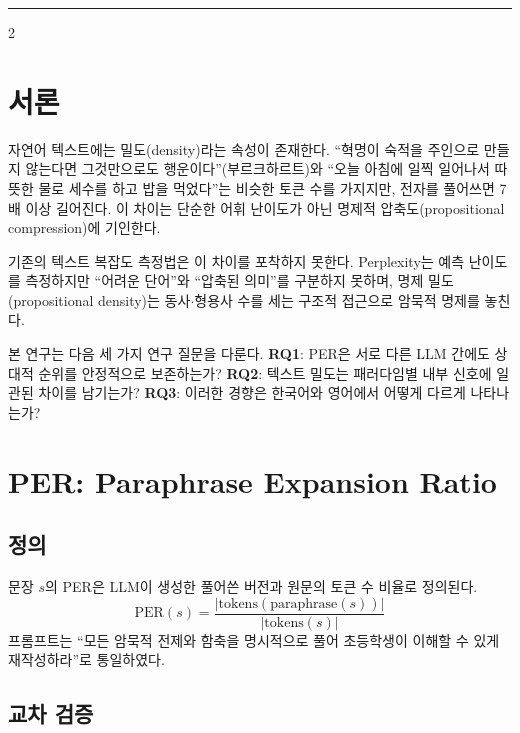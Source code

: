 \documentclass[10pt,a4paper]{article}
\begin{document}
\vspace{10pt}
\noindent\rule{\textwidth}{0.4pt}
\vspace{6pt}

\begin{multicols}{2}

\section{서론}

자연어 텍스트에는 밀도(density)라는 속성이 존재한다. ``혁명이 숙적을 주인으로 만들지 않는다면 그것만으로도 행운이다''(부르크하르트)와 ``오늘 아침에 일찍 일어나서 따뜻한 물로 세수를 하고 밥을 먹었다''는 비슷한 토큰 수를 가지지만, 전자를 풀어쓰면 7배 이상 길어진다. 이 차이는 단순한 어휘 난이도가 아닌 명제적 압축도(propositional compression)에 기인한다.

기존의 텍스트 복잡도 측정법은 이 차이를 포착하지 못한다. Perplexity는 예측 난이도를 측정하지만 ``어려운 단어''와 ``압축된 의미''를 구분하지 못하며, 명제 밀도(propositional density)\cite{kemper1990}는 동사$\cdot$형용사 수를 세는 구조적 접근으로 암묵적 명제를 놓친다.

본 연구는 다음 세 가지 연구 질문을 다룬다. \textbf{RQ1}: PER은 서로 다른 LLM 간에도 상대적 순위를 안정적으로 보존하는가? \textbf{RQ2}: 텍스트 밀도는 패러다임별 내부 신호에 일관된 차이를 남기는가? \textbf{RQ3}: 이러한 경향은 한국어와 영어에서 어떻게 다르게 나타나는가?

\section{PER: Paraphrase Expansion Ratio}

\subsection{정의}

문장 $s$의 PER은 LLM이 생성한 풀어쓴 버전과 원문의 토큰 수 비율로 정의된다.
\begin{equation}
\mathrm{PER}(s) = \frac{|\mathrm{tokens}(\mathrm{paraphrase}(s))|}{|\mathrm{tokens}(s)|}
\end{equation}
프롬프트는 ``모든 암묵적 전제와 함축을 명시적으로 풀어 초등학생이 이해할 수 있게 재작성하라''로 통일하였다.

\subsection{교차 검증}


\end{multicols}
\end{document}
